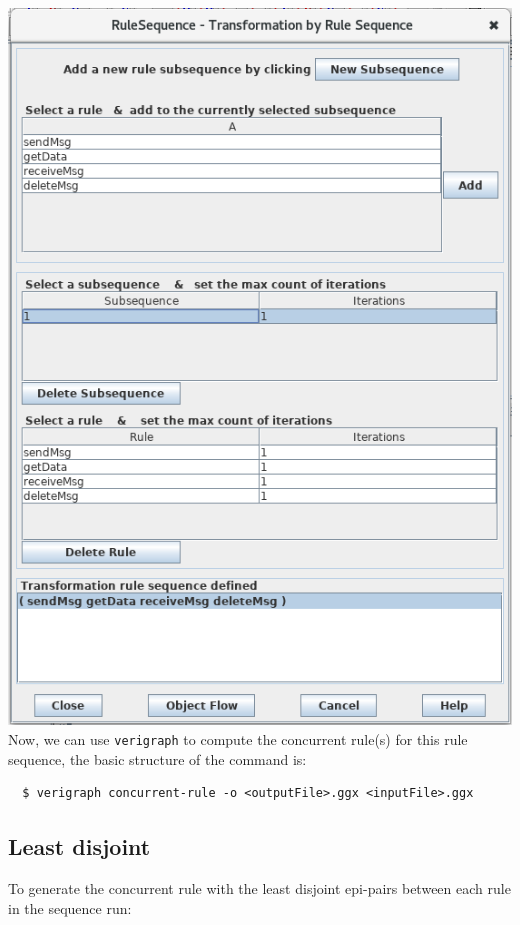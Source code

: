 \documentclass[12pt]{article}
\begin{document}
\noindent
\includegraphics[scale = 0.6]{rule-sequence_03.png}\\

Now, we can use \texttt{verigraph} to compute the concurrent rule(s) for this rule sequence, the basic structure of the command is:

\begin{verbatim}
  $ verigraph concurrent-rule -o <outputFile>.ggx <inputFile>.ggx
\end{verbatim}

\subsection{Least disjoint}

To generate the concurrent rule with the least disjoint epi-pairs between each rule in the sequence run:
\end{document}
